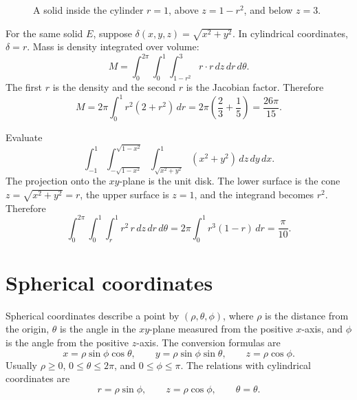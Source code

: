 \documentclass[11pt,oneside]{book}
\begin{document}
\begin{figure}[H]
\centering
{}
\caption{A solid inside the cylinder $r=1$, above $z=1-r^2$, and below $z=3$.}
\end{figure}

\begin{examplebox}
For the same solid $E$, suppose $\delta(x,y,z)=\sqrt{x^2+y^2}$. In cylindrical coordinates, $\delta=r$. Mass is density integrated over volume:
\[
M=\int_0^{2\pi}\int_0^1\int_{1-r^2}^{3} r\cdot r\,dz\,dr\,d\theta.
\]
The first $r$ is the density and the second $r$ is the Jacobian factor. Therefore
\[
M=2\pi\int_0^1 r^2(2+r^2)\,dr
=2\pi\left(\frac{2}{3}+\frac15\right)=\frac{26\pi}{15}.
\]
\end{examplebox}

\begin{examplebox}
Evaluate
\[
\int_{-1}^{1}\int_{-\sqrt{1-x^2}}^{\sqrt{1-x^2}}\int_{\sqrt{x^2+y^2}}^{1} (x^2+y^2)\,dz\,dy\,dx.
\]
The projection onto the $xy$-plane is the unit disk. The lower surface is the cone $z=\sqrt{x^2+y^2}=r$, the upper surface is $z=1$, and the integrand becomes $r^2$. Therefore
\[
\int_0^{2\pi}\int_0^1\int_r^1 r^2\,r\,dz\,dr\,d\theta
=2\pi\int_0^1 r^3(1-r)\,dr=\frac{\pi}{10}.
\]
\end{examplebox}

\section{Spherical coordinates}

\begin{definitionbox}
Spherical coordinates describe a point by $(\rho,\theta,\phi)$, where $\rho$ is the distance from the origin, $\theta$ is the angle in the $xy$-plane measured from the positive $x$-axis, and $\phi$ is the angle from the positive $z$-axis. The conversion formulas are
\[
x=\rho\sin\phi\cos\theta,
\qquad
y=\rho\sin\phi\sin\theta,
\qquad
z=\rho\cos\phi.
\]
Usually $\rho\ge 0$, $0\le \theta\le 2\pi$, and $0\le \phi\le \pi$. The relations with cylindrical coordinates are
\[
r=\rho\sin\phi,\qquad z=\rho\cos\phi,\qquad \theta=\theta.
\]
\end{definitionbox}
\end{document}
